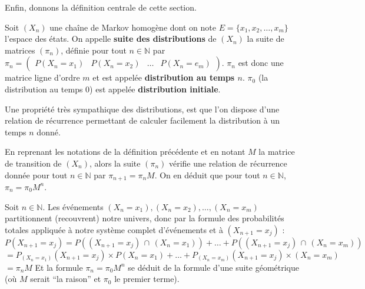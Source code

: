 	Enfin, donnons la définition centrale de cette section.
	
	\begin{formula}[Définition]
		\contentwidth[big]
		Soit $(X_n)$ une chaîne de Markov homogène dont on note $E = \{x_1, x_2, \dots, x_m\}$ l'espace des états. On appelle \textbf{suite des distributions} de $(X_n)$ la suite de matrices $(\pi_n)$, définie pour tout $n \in \mathbb{N}$ par $\displaystyle{\pi_n = \begin{pmatrix} P(X_n = x_1) & P(X_n = x_2) & \dots & P(X_n = e_m) \end{pmatrix}}$.
		\newpar
		$\pi_n$ est donc une matrice ligne d'ordre $m$ et est appelée \textbf{distribution au temps $n$}.
		\newpar
		$\pi_0$ (la distribution au temps $0$) est appelée \textbf{distribution initiale}.
	\end{formula}
	
	Une propriété très sympathique des distributions, est que l'on dispose d'une relation de récurrence permettant de calculer facilement la distribution à un temps $n$ donné.
	
	\begin{formula}
		En reprenant les notations de la définition précédente et en notant $M$ la matrice de transition de $(X_n)$, alors la suite $(\pi_n)$ vérifie une relation de récurrence donnée pour tout $n \in \mathbb{N}$ par $\pi_{n+1} = \pi_n M$.
		\newpar
		On en déduit que pour tout $n \in \mathbb{N}$, $\pi_n = \pi_0 M^n$.
	\end{formula}
	
	\begin{demonstration}
		Soit $n \in \mathbb{N}$. Les événements $(X_n = x_1), (X_n = x_2), \dots, (X_n =x_m)$ partitionnent (recouvrent) notre univers, donc par la formule des probabilités totales appliquée à notre système complet d'événements et à $(X_{n+1} = x_j)$ :
		\newpar
		$P(X_{n+1} = x_j) = P((X_{n+1} = x_j) \, \cap \, (X_n = x_1)) + \dots + P((X_{n+1} = x_j) \, \cap \, (X_n = x_m))$
		\newline
		$= P_{(X_n = x_1)}(X_{n+1} = x_j) \times P(X_n = x_1) + \dots + P_{(X_n = x_m)}(X_{n+1} = x_j) \times (X_n = x_m)$
		\newline
		$= \pi_n M$
		\newpar
		Et la formule $\pi_n = \pi_0 M^n$ se déduit de la formule d'une suite géométrique (où $M$ serait ``la raison'' et $\pi_0$ le premier terme).
	\end{demonstration}
	
